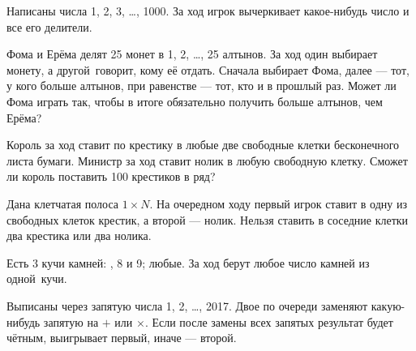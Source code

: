 \documentclass[11pt,a4paper]{article}
\begin{document}
Написаны числа 1, 2, 3, \dots, 1000.
За ход игрок вычеркивает какое-нибудь число
и все его делители.

Фома и Ерёма делят 25 монет в 1, 2, \dots, 25
алтынов.  За ход один выбирает монету, а другой~говорит,
кому её отдать. Сначала выбирает Фома, далее --- тот, у кого
больше алтынов, при равенстве --- тот, кто и в прошлый раз.  Может ли
Фома играть так, чтобы в итоге обязательно получить больше алтынов,
чем Ерёма?


\vspace*{-1truemm}






Король за ход ставит по крестику в любые две свободные клетки
бесконечного листа бумаги. Министр за ход ставит нолик в любую
свободную клетку. Сможет ли король поставить 100 крестиков в ряд?

Дана клетчатая полоса $1\times N$. На очередном ходу первый игрок ставит в одну из свободных клеток крестик, а второй --- нолик.
Нельзя ставить в соседние клетки два крестика или два нолика.


 Есть 3 кучи камней:\!\!\!
, 8 и 9;\!\!\!
 \!\!\! любые.
За ход берут любое число камней из одной~кучи.

Выписаны через запятую числа 1, 2, \dots, 2017.
Двое по очереди заменяют какую-нибудь запятую на $+$ или $\times$.
Если после замены всех запятых результат будет чётным,
выигрывает первый, иначе --- второй.
\end{document}
